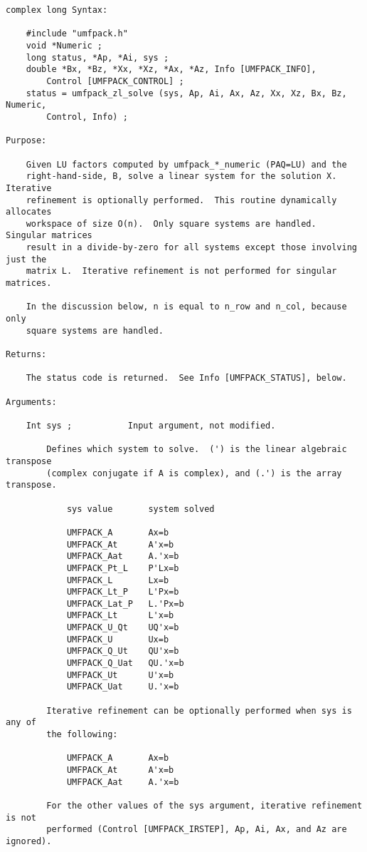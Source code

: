{\begin{verbatim}
complex long Syntax:

    #include "umfpack.h"
    void *Numeric ;
    long status, *Ap, *Ai, sys ;
    double *Bx, *Bz, *Xx, *Xz, *Ax, *Az, Info [UMFPACK_INFO],
        Control [UMFPACK_CONTROL] ;
    status = umfpack_zl_solve (sys, Ap, Ai, Ax, Az, Xx, Xz, Bx, Bz, Numeric,
        Control, Info) ;

Purpose:

    Given LU factors computed by umfpack_*_numeric (PAQ=LU) and the
    right-hand-side, B, solve a linear system for the solution X.  Iterative
    refinement is optionally performed.  This routine dynamically allocates
    workspace of size O(n).  Only square systems are handled.  Singular matrices
    result in a divide-by-zero for all systems except those involving just the
    matrix L.  Iterative refinement is not performed for singular matrices.

    In the discussion below, n is equal to n_row and n_col, because only
    square systems are handled.

Returns:

    The status code is returned.  See Info [UMFPACK_STATUS], below.

Arguments:

    Int sys ;           Input argument, not modified.

        Defines which system to solve.  (') is the linear algebraic transpose
        (complex conjugate if A is complex), and (.') is the array transpose.

            sys value       system solved

            UMFPACK_A       Ax=b
            UMFPACK_At      A'x=b
            UMFPACK_Aat     A.'x=b
            UMFPACK_Pt_L    P'Lx=b
            UMFPACK_L       Lx=b
            UMFPACK_Lt_P    L'Px=b
            UMFPACK_Lat_P   L.'Px=b
            UMFPACK_Lt      L'x=b
            UMFPACK_U_Qt    UQ'x=b
            UMFPACK_U       Ux=b
            UMFPACK_Q_Ut    QU'x=b
            UMFPACK_Q_Uat   QU.'x=b
            UMFPACK_Ut      U'x=b
            UMFPACK_Uat     U.'x=b

        Iterative refinement can be optionally performed when sys is any of
        the following:

            UMFPACK_A       Ax=b
            UMFPACK_At      A'x=b
            UMFPACK_Aat     A.'x=b

        For the other values of the sys argument, iterative refinement is not
        performed (Control [UMFPACK_IRSTEP], Ap, Ai, Ax, and Az are ignored).


\end{verbatim}}
